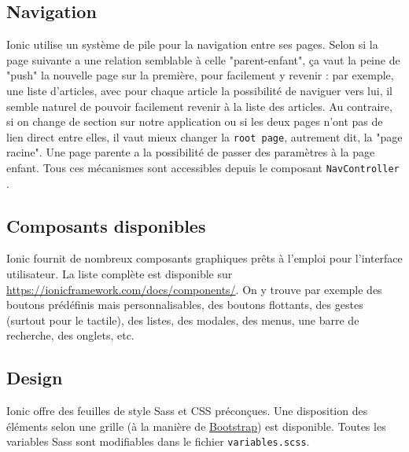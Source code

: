 \documentclass[a4paper, 12pt]{article}
\begin{document}
\subsection{Navigation}
Ionic utilise un système de pile pour la navigation entre ses pages. Selon si la page suivante a une relation 
semblable à celle "parent-enfant", ça vaut la peine de "push" la nouvelle page sur la première, pour facilement y 
revenir : par exemple, une liste d'articles, avec pour chaque article la possibilité de naviguer vers lui, il semble 
naturel de pouvoir facilement revenir à la liste des articles. Au contraire, si on change de section sur notre 
application ou si les deux pages n'ont pas de lien direct entre elles, il vaut mieux changer la \texttt{root page}, 
autrement dit, la "page racine". Une page parente a la possibilité de passer des paramètres à la page enfant. 
Tous ces mécanismes sont accessibles depuis le composant \texttt{NavController} \cite{ref50}.

\subsection{Composants disponibles}
Ionic fournit de nombreux composants graphiques  prêts à l'emploi pour l'interface utilisateur. La liste complète 
est disponible sur \url{https://ionicframework.com/docs/components/}. On y trouve par exemple des boutons prédéfinis 
mais personnalisables, des boutons flottants, des gestes (surtout pour le tactile), des listes, des modales, des menus,
une barre de recherche, des onglets, etc.

\subsection{Design}
Ionic offre des feuilles de style Sass et CSS préconçues. Une disposition des éléments 
selon une grille (à la manière de \href{http://getbootstrap.com/}{Bootstrap}) est disponible. Toutes les variables Sass 
sont modifiables dans le fichier \texttt{variables.scss}.
\end{document}
